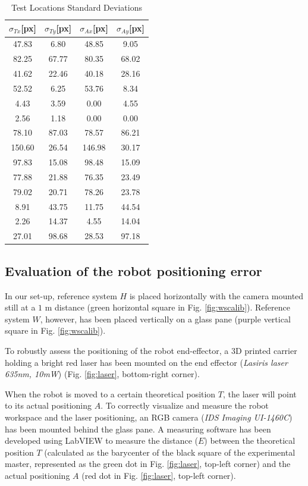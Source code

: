 \documentclass[a4paper, 10pt, conference]{ieeeconf}      %
\begin{document}
\begin{table}[h]
\begin{center}
\caption{Test Locations Standard Deviations}
\label{tab:firm}
\begin{tabular}{|c||c||c||c|}
\hline
$\sigma_{Tx}$[px] & $\sigma_{Ty}$[px] & $\sigma_{Ax}$[px] & $\sigma_{Ay}$[px] \\
\hline
47.83 & 6.80 & 48.85 & 9.05\\
82.25 & 67.77 & 80.35 & 68.02\\
41.62 & 22.46 & 40.18 & 28.16\\
52.52 & 6.25 & 53.76 & 8.34\\
4.43 & 3.59 & 0.00 & 4.55\\
2.56 & 1.18 & 0.00 & 0.00\\
78.10 & 87.03 & 78.57 & 86.21\\
150.60 & 26.54 & 146.98 & 30.17\\
97.83 & 15.08 & 98.48 & 15.09\\
77.88 & 21.88 & 76.35 & 23.49\\
79.02 & 20.71 & 78.26 & 23.78\\
8.91 & 43.75 & 11.75 & 44.54\\
2.26 & 14.37 & 4.55 & 14.04\\
27.01 & 98.68 & 28.53 & 97.18\\
\hline
\end{tabular}
\end{center}
\end{table}

\subsection{Evaluation of the robot positioning error}
In our set-up, reference system $H$ is placed horizontally with the camera mounted still at a $1$ m distance (green horizontal square in Fig. \ref{fig:wscalib}). Reference system $W$, however, has been placed vertically on a glass pane (purple vertical square in Fig. \ref{fig:wscalib}).

To robustly assess the positioning of the robot end-effector, a 3D printed carrier holding a bright red laser has been mounted on the end effector (\textit{Lasiris laser 635nm, 10mW}) (Fig. \ref{fig:laser}, bottom-right corner).

When the robot is moved to a certain theoretical position $T$, the laser will point to its actual positioning $A$. To correctly visualize and measure the robot workspace and the laser positioning, an RGB camera (\textit{IDS Imaging UI-1460C}) has been mounted behind the glass pane.
A measuring software has been developed using LabVIEW to measure the distance ($E$) between the theoretical position $T$ (calculated as the barycenter of the black square of the experimental master, represented as the green dot in Fig. \ref{fig:laser}, top-left corner) and the actual positioning $A$ (red dot in Fig. \ref{fig:laser}, top-left corner).
\end{document}
